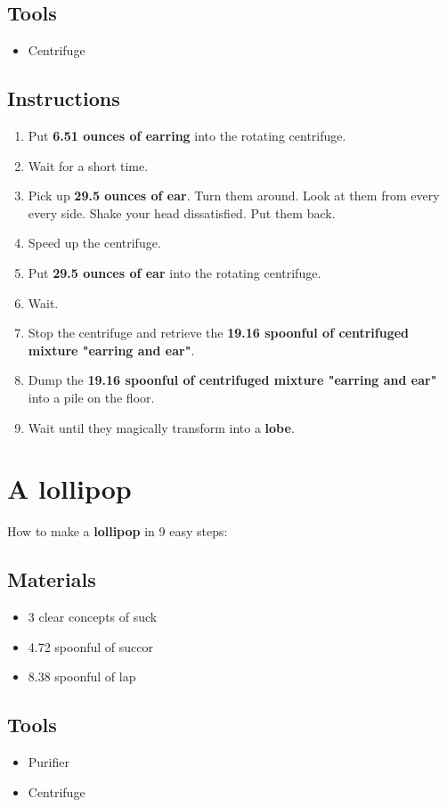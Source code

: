 \documentclass{article}
\begin{document}
\subsection{Tools}\begin{itemize}
\item 
Centrifuge
\end{itemize}
\subsection{Instructions}\begin{enumerate}
\item 
Put \textbf{6.51 ounces of earring} into the rotating centrifuge.
\item 
Wait for a short time.
\item 
Pick up \textbf{29.5 ounces of ear}. Turn them around. Look at them from every every side. Shake your head dissatisfied. Put them back.
\item 
Speed up the centrifuge.
\item 
Put \textbf{29.5 ounces of ear} into the rotating centrifuge.
\item 
Wait.
\item 
Stop the centrifuge and retrieve the \textbf{19.16 spoonful of centrifuged mixture "earring and ear"}.
\item 
Dump the \textbf{19.16 spoonful of centrifuged mixture "earring and ear"} into a pile on the floor.
\item 
Wait until they magically transform into a \textbf{lobe}.
\end{enumerate}
\newpage
\section{A lollipop}How to make a \textbf{lollipop} in 9 easy steps:

\subsection{Materials}\begin{itemize}
\item 
3 clear concepts of suck
\item 
4.72 spoonful of succor
\item 
8.38 spoonful of lap
\end{itemize}
\subsection{Tools}\begin{itemize}
\item 
Purifier
\item 
Centrifuge
\end{itemize}
\end{document}

